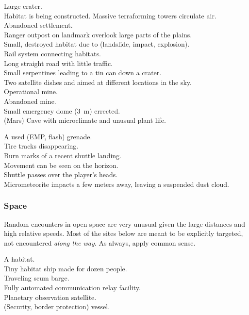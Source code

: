 \documentclass[a4]{article}
\begin{document}
\starttableone
Large crater.\\
Habitat is being constructed.
Massive terraforming towers circulate air.\\
Abandoned settlement.\\
Ranger outpost on landmark overlook large parts of the plains.\\
Small, destroyed habitat due to (landslide, impact, explosion).\\
Rail system connecting habitats.\\
Long straight road with little traffic.\\
Small serpentines leading to a tin can down a crater.\\
Two satellite dishes and aimed at different locations in the sky.\\
Operational mine.\\
Abandoned mine.\\
Small emergency dome (\SI{3}{\m}) errected.\\
(Mars) Cave with microclimate and unusual plant life.\\
\stoptableone


\starttableone
A used (EMP, flash) grenade.\\
Tire tracks disappearing.\\
Burn marks of a recent shuttle landing.\\
Movement can be seen on the horizon.\\
Shuttle passes over the player's heads.\\
Micrometeorite impacts a few meters away, leaving a suspended dust cloud.\\
\stoptableone



\subsubsection{Space}

Random encounters in open space are very unusual given the large distances and high relative speeds.
Most of the sites below are meant to be explicitly targeted, not encountered \textit{along the way}.
As always, apply common sense.

\starttableone
A habitat.\\
Tiny habitat ship made for dozen people.\\
Traveling scum barge.\\
Fully automated communication relay facility.\\
Planetary observation satellite.\\
(Security, border protection) vessel.\\
\stoptableone
\end{document}
